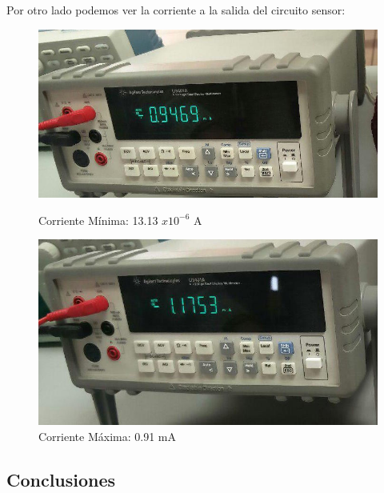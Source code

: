 \documentclass[12pt, fleqn]{article}                            %
\theoremstyle{break}                                            %
\begin{document}
            Por otro lado podemos ver la corriente a la salida del circuito sensor:
            \begin{figure}[!htb]
                \centering
                \begin{minipage}{.5\textwidth}
                    \centering
                \includegraphics[width=0.85\linewidth]{Medicion1AmperajeMin}
                \caption{Corriente Mínima: 13.13 $x10^{-6}$ A}
                \end{minipage}%
                \begin{minipage}{0.5\textwidth}
                    \centering
                \includegraphics[width=0.85\linewidth]{Medicion1AmperajeMax}
                \caption{Corriente Máxima: 0.91 mA}
                \end{minipage}
            \end{figure}



    \clearpage
    \subsection{Conclusiones} 
\end{document}
